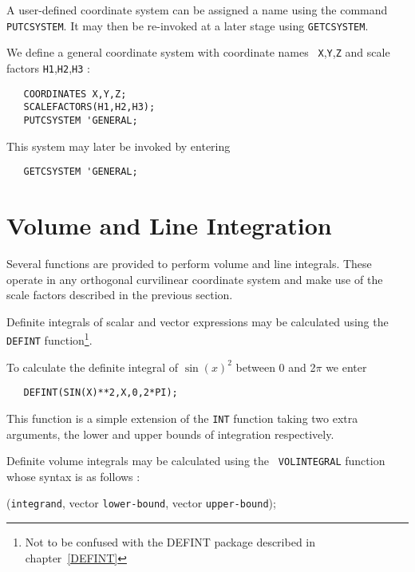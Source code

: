 A user-defined coordinate system can be assigned a name using the
command {\tt PUTCSYSTEM}. It may then be re-invoked at a later stage using
{\tt GETCSYSTEM}.

\example{}

We define a general coordinate system with coordinate names {\tt
X},{\tt Y},{\tt Z} and scale factors {\tt H1},{\tt H2},{\tt H3} :

\begin{verbatim}
   COORDINATES X,Y,Z;
   SCALEFACTORS(H1,H2,H3);
   PUTCSYSTEM 'GENERAL;
\end{verbatim}

This system may later be invoked by entering

\begin{verbatim}
   GETCSYSTEM 'GENERAL;
\end{verbatim}

\section{Volume and Line Integration}

Several functions are provided to perform volume and line integrals.
These operate in any orthogonal curvilinear coordinate system and
make use of the scale factors described in the previous section.

Definite integrals of scalar and vector expressions may be calculated
using the {\tt DEFINT} function\footnote{Not to be confused with the
DEFINT package described in chapter~\ref{DEFINT}}.

\example{}

\noindent To calculate the definite integral of $\sin(x)^2$ between 0 and
2$\pi$ we enter

\begin{verbatim}
   DEFINT(SIN(X)**2,X,0,2*PI);
\end{verbatim}

This function is a simple extension of the {\tt INT} function taking
two extra arguments, the lower and upper bounds of integration
respectively.

Definite volume integrals may be calculated using the {\tt
VOLINTEGRAL} function whose syntax is as follows :

({\tt integrand}, vector {\tt lower-bound},
vector {\tt upper-bound});

